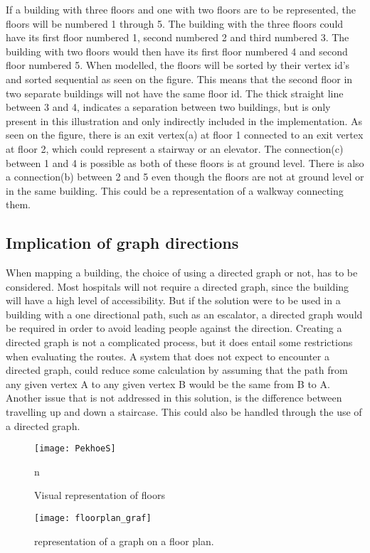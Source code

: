 If a building with three floors and one with two floors are to be represented, the floors will be numbered 1 through 5. The building with the three floors could have its first floor numbered 1, second numbered 2 and third numbered 3. The building with two floors would then have its first floor numbered 4 and second floor numbered 5. When modelled, the floors will be sorted by their vertex id's and sorted sequential as seen on the figure. This means that the second floor in two separate buildings will not have the same floor id. The thick straight line between 3 and 4, indicates a separation between two buildings, but is only present in this illustration and only indirectly included in the implementation. As seen on the figure, there is an exit vertex(a) at floor 1 connected to an exit vertex at floor 2, which could represent a stairway or an elevator. The connection(c) between 1 and 4 is possible as both of these floors is at ground level. There is also a connection(b) between 2 and 5 even though the floors are not at ground level or in the same building. This could be a representation of a walkway connecting them.

\subsection{Implication of graph directions}

When mapping a building, the choice of using a directed graph or not, has to be considered. Most hospitals will not require a directed graph, since the building will have a high level of accessibility. But if the solution were to be used in a building with a one directional path, such as an escalator, a directed graph would be required in order to avoid leading people against the direction. Creating a directed graph is not a complicated process, but it does entail some restrictions when evaluating the routes. A system that does not expect to encounter a directed graph, could reduce some calculation by assuming that the path from any given vertex A to any given vertex B would be the same from B to A. Another issue that is not addressed in this solution, is the difference between travelling up and down a staircase. This could also be handled through the use of a directed graph.


\begin{figure}[ht!]
    \centering
    \texttt{[image: PekhoeS]}
    \caption{Visual representation of floors}n
    \label{fig:PekhoeS}
  \end{figure}

\begin{figure}[ht!]
    \centering
    \texttt{[image: floorplan\_graf]}
    \caption{representation of a graph on a floor plan.}
    \label{fig:floorplan_graf}
  \end{figure}

